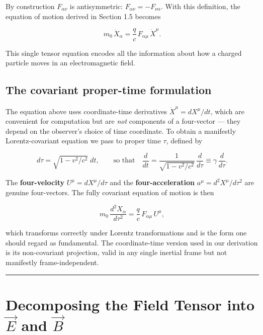 By construction $F_{\alpha\nu}$ is antisymmetric: $F_{\alpha\nu} = -F_{\nu\alpha}$. With this definition, the equation of motion derived in Section 1.5 becomes

\begin{equation}
\boxed{m_0\,\ddot{X}_\alpha = \frac{q}{c}\,F_{\alpha\mu}\,\dot{X}^\mu.}
\end{equation}

This single tensor equation encodes all the information about how a charged particle moves in an electromagnetic field.

\subsection*{The covariant proper-time formulation}

The equation above uses coordinate-time derivatives $\dot{X}^\mu = dX^\mu/dt$, which are convenient for computation but are \emph{not} components of a four-vector --- they depend on the observer's choice of time coordinate. To obtain a manifestly Lorentz-covariant equation we pass to proper time $\tau$, defined by

\begin{equation}
d\tau = \sqrt{1 - v^2/c^2}\;dt, \qquad \text{so that} \quad \frac{d}{dt} = \frac{1}{\sqrt{1-v^2/c^2}}\,\frac{d}{d\tau} \equiv \gamma\,\frac{d}{d\tau}.
\end{equation}

The \textbf{four-velocity} $U^\mu = dX^\mu/d\tau$ and the \textbf{four-acceleration} $a^\mu = d^2X^\mu/d\tau^2$ are genuine four-vectors. The fully covariant equation of motion is then

\begin{equation}
\boxed{m_0\,\frac{d^2 X_\alpha}{d\tau^2} = \frac{q}{c}\,F_{\alpha\mu}\,U^\mu,}
\end{equation}

which transforms correctly under Lorentz transformations and is the form one should regard as fundamental. The coordinate-time version used in our derivation is its non-covariant projection, valid in any single inertial frame but not manifestly frame-independent.

\hrule
\vspace{1em}

\section{Decomposing the Field Tensor into $\vec{E}$ and $\vec{B}$}

